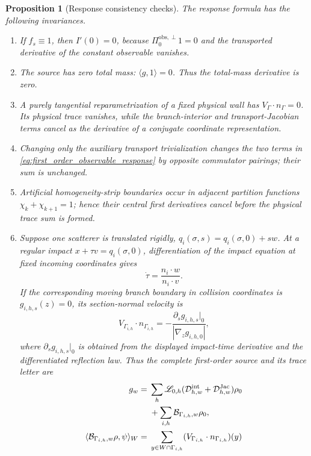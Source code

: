 \documentclass[11pt]{amsart}
\theoremstyle{compactplain}
\newtheorem*{proposition*}{Proposition}
\theoremstyle{compactdefinition}
\theoremstyle{compactremark}
\newcommand{\Ltransfer}{\mathscr L}
\newcommand{\Piobsperp}{\Pi^{\mathrm{obs},\perp}}
\begin{document}
\begin{proposition*}[Response consistency checks]
The response formula has the following invariances.
\begin{enumerate}[label=\textup{(C\arabic*)},wide,labelindent=0pt]
  \item If \(f_s\equiv1\), then \(I'(0)=0\), because
  \(\Piobsperp_0 1=0\) and the transported derivative of the constant observable
  vanishes.
  \item The source has zero total mass:
  \(\langle g,1\rangle=0\).  Thus the total-mass derivative is zero.
  \item A purely tangential reparametrization of a fixed physical wall has
  \(V_\Gamma\cdot n_\Gamma=0\).  Its physical trace vanishes, while the
  branch-interior and transport-Jacobian terms cancel as the derivative of a
  conjugate coordinate representation.
  \item Changing only the auxiliary transport trivialization changes the two
  terms in \eqref{eq:first_order_observable_response} by opposite commutator
  pairings; their sum is unchanged.
  \item Artificial homogeneity-strip boundaries occur in adjacent partition
  functions \(\chi_k+\chi_{k+1}=1\); hence their central first derivatives
  cancel before the physical trace sum is formed.
  \item Suppose one scatterer is translated rigidly,
  \(q_i(\sigma,s)=q_i(\sigma,0)+sw\).  At a regular impact
  \(x+\tau v=q_i(\sigma,0)\), differentiation of the impact equation at fixed
  incoming coordinates gives
  \[
    \dot\tau=\frac{n_i\cdot w}{n_i\cdot v}.
  \]
  If the corresponding moving branch boundary in collision coordinates is
  \(g_{i,h,s}(z)=0\), its section-normal velocity is
  \[
    V_{\Gamma_{i,h}}\cdot n_{\Gamma_{i,h}}
    =-\frac{\partial_sg_{i,h,s}|_0}{|\nabla_zg_{i,h,0}|},
  \]
  where \(\partial_sg_{i,h,s}|_0\) is obtained from the displayed impact-time
  derivative and the differentiated reflection law.  Thus the complete
  first-order source and its trace letter are
  \begin{align}
    g_w={}&\sum_h\Ltransfer_{0,h}
      (\mathcal D_{h,w}^{\rm int}+\mathcal D_{h,w}^{\rm Jac})\rho_0
      \notag\\
      &+\sum_{i,h}\mathcal B_{\Gamma_{i,h},w}\rho_0,
      \label{eq:rigid_translation_source}\\
    \langle\mathcal B_{\Gamma_{i,h},w}\rho,\psi\rangle_W
    ={}&\sum_{y\in W\cap\Gamma_{i,h}}
      (V_{\Gamma_{i,h}}\cdot n_{\Gamma_{i,h}})(y)\notag\\

\end{align}
\end{enumerate}
\end{proposition*}
\end{document}
